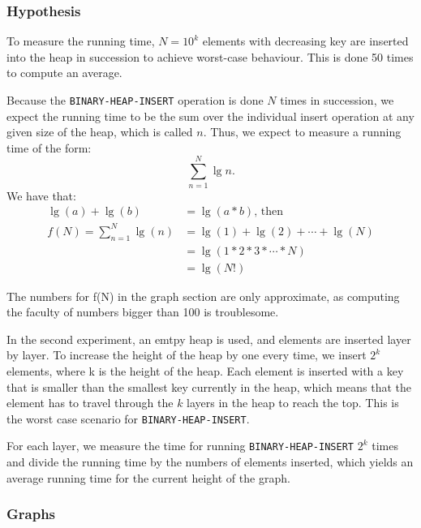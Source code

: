 \documentclass[a4paper,oneside,11pt]{article}
\begin{document}
\subsubsection*{Hypothesis}
To measure the running time, $N=10^k$ elements with decreasing key are inserted into the heap in succession to achieve worst-case behaviour. This is done 50 times to compute an average.

Because the \texttt{BINARY-HEAP-INSERT} operation is done $N$ times in succession, we expect the running time to be the sum over the individual insert operation at any given size of the heap, which is called $n$.
Thus, we expect to measure a running time of the form: \[\sum^N_{n=1}\lg n.\]
We have that:
\begin{align*}
  \lg(a)+\lg(b)&=\lg(a*b)\text{, then}\\
  f(N)=\sum^N_{n=1}\lg(n)&=\lg(1)+\lg(2)+\cdots+\lg(N)\\
  &=\lg(1*2*3*\cdots *N)\\
  &=\lg(N!)
\end{align*}

The numbers for f(N) in the graph section are only approximate, as computing the faculty of numbers bigger than 100 is troublesome.

In the second experiment, an emtpy heap is used, and elements are inserted layer by layer. To increase the height of the heap by one every time, we insert $2^k$ elements, where k is the height of the heap. Each element is inserted with a key that is smaller than the smallest key currently in the heap, which means that the element has to travel through the $k$ layers in the heap to reach the top. This is the worst case scenario for \texttt{BINARY-HEAP-INSERT}.

For each layer, we measure the time for running \texttt{BINARY-HEAP-INSERT} $2^k$ times and divide the running time by the numbers of elements inserted, which yields an average running time for the current height of the graph.
\subsubsection*{Graphs}
\end{document}
